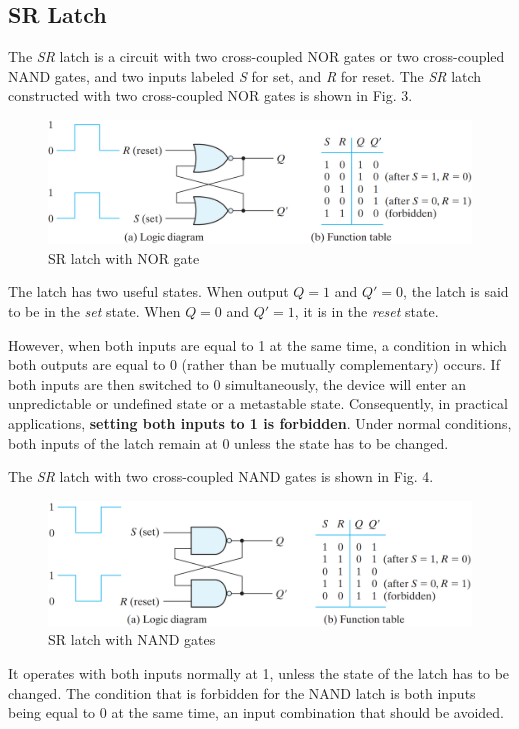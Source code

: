 \subsection{SR Latch}
\label{subsec:sr-latch}

The \textit{SR} latch is a circuit with two cross-coupled NOR gates or two cross-coupled NAND gates, and two inputs labeled \textit{S} for set, and \textit{R} for reset. The \textit{SR} latch constructed with two cross-coupled NOR gates is shown in Fig. 3. 
\begin{figure}[H]
  \centering
  \includegraphics[width=\linewidth]{img/fig-5.3.png}
  \caption{SR latch with NOR gate}
  \label{fig:5.3}
\end{figure}
\noindent The latch has two useful states. When output $Q = 1$ and $Q' = 0$, the latch is said to be in the \textit{set} state. When $Q = 0$ and $Q' = 1$, it is in the \textit{reset} state.

However, when both inputs are equal to 1 at the same time, a condition in which both outputs are equal to 0 (rather than be mutually complementary) occurs. If both inputs are then switched to 0 simultaneously, the device will enter an unpredictable or undefined state or a metastable state. Consequently, in practical applications, \textbf{setting both inputs to 1 is forbidden}. Under normal conditions, both inputs of the latch remain at 0 unless the state has to be changed.

The \textit{SR} latch with two cross-coupled NAND gates is shown in Fig. 4. 
\begin{figure}[H]
  \centering
  \includegraphics[width=\linewidth]{img/fig-5.4.png}
  \caption{SR latch with NAND gates}
  \label{fig:5.4}
\end{figure}
It operates with both inputs normally at 1, unless the state of the latch has to be changed. The condition that is forbidden for the NAND latch is both inputs being equal to 0 at the same time, an input combination that should be avoided.

